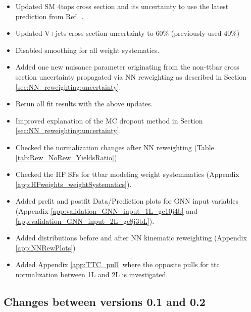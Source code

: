 \begin{itemize}
  \item Updated SM 4tops cross section and its uncertainty to use the latest prediction from Ref.~\cite{vanBeekveld:2022hty}.
  \item Updated V+jets cross section uncertainty to 60\% (previously used 40\%)
  \item Disabled smoothing for all weight systematics.
  \item Added one new nuisance parameter originating from the non-ttbar cross section uncertainty propagated via NN reweighting as described in Section \ref{sec:NN_reweighting:uncertainty}.
  \item Rerun all fit results with the above updates.
  \item Improved explanation of the MC dropout method in Section \ref{sec:NN_reweighting:uncertainty}.
  \item Checked the normalization changes after NN reweighting (Table \ref{tab:Rew_NoRew_YieldsRatio})
  \item Checked the HF SFs for ttbar modeling weight systemmatics (Appendix \ref{app:HFweights_weightSystematics}).
  \item Added prefit and postfit Data/Prediction plots for GNN input variables (Appendix \ref{app:validation_GNN_input_1L_ge10j4b} and \ref{app:validation_GNN_input_2L_ge8j3bL}).
  \item Added distributions before and after NN kinematic reweighting (Appendix \ref{app:NNRewPlots})
  \item Added Appendix \ref{app:TTC_pull} where the opposite pulls for ttc normalization between 1L and 2L is investigated.
\end{itemize}




\subsection{Changes between versions 0.1 and 0.2}

